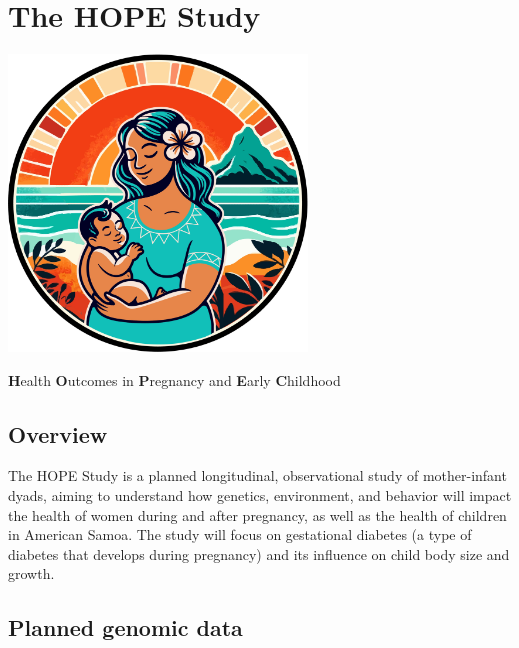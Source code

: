 \documentclass[
  letterpaper,
  DIV=11,
  numbers=noendperiod]{scrreprt}
\begin{document}

\chapter*{The HOPE Study}\label{the-hope-study}


\begin{center}
\includegraphics[width=3.125in,height=\textheight]{HOPE.png}
\end{center}

\textbf{H}ealth \textbf{O}utcomes in \textbf{P}regnancy and
\textbf{E}arly \textbf{C}hildhood

\section*{Overview}\label{overview-1}


The HOPE Study is a planned longitudinal, observational study of
mother-infant dyads, aiming to understand how genetics, environment, and
behavior will impact the health of women during and after pregnancy, as
well as the health of children in American Samoa. The study will focus
on gestational diabetes (a type of diabetes that develops during
pregnancy) and its influence on child body size and growth.

\section*{Planned genomic data}\label{planned-genomic-data}
\end{document}
